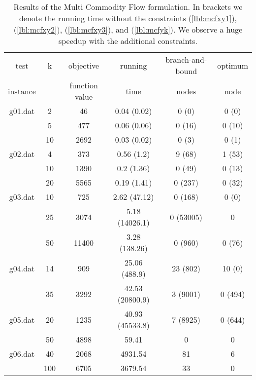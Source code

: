 \documentclass [11pt]{article}
\begin{document}
\begin{table} \small
\centering
\begin{tabular}{cccccc}
\hline
test & k & objective & running  & branch-and-bound & optimum    \\
instance & & function value & time & nodes & node  \\
\hline
g01.dat 	& 2 & 46 & 0.04 (0.02) & 0 (0) & 0 (0) \\
		& 5 & 477 & 0.06 (0.06) & 0 (16) & 0 (10) \\
		& 10 & 2692 & 0.03 (0.02) & 0 (3) & 0 (1) \\
g02.dat 	& 4 & 373 & 0.56 (1.2) & 9 (68) & 1 (53) \\
		& 10 & 1390 & 0.2 (1.36) & 0 (49) & 0 (13) \\
		& 20 & 5565 & 0.19 (1.41) & 0 (237) & 0 (32) \\
g03.dat 	& 10 & 725 & 2.62 (47.12) & 0 (168) & 0 (0) \\
		& 25 & 3074 & 5.18 (14026.1) & 0 (53005) & 0 \\
		& 50 & 11400 & 3.28 (138.26) & 0 (960) & 0 (76) \\
g04.dat 	& 14 & 909 & 25.06 (488.9) & 23 (802) & 10 (0) \\
		& 35 & 3292 & 42.53 (20800.9) & 3 (9001) & 0 (494) \\
g05.dat 	& 20 & 1235 & 40.93 (45533.8) & 7 (8925) & 0 (644) \\
		& 50 & 4898 & 59.41 & 0 & 0 \\
g06.dat 	& 40 & 2068 & 4931.54 & 81 & 6 \\
		& 100 & 6705 & 3679.54 & 33 & 0 \\
\hline
\end{tabular}
\caption{Results of the Multi Commodity Flow formulation.
In brackets we denote the running time without the constraints (\ref{lbl:mcfxy1}), (\ref{lbl:mcfxy2}), (\ref{lbl:mcfxy3}), and (\ref{lbl:mcfyk}).
We observe a huge speedup with the additional constraints.}
\label{tbl:mcf}
\end{table}
\end{document}
